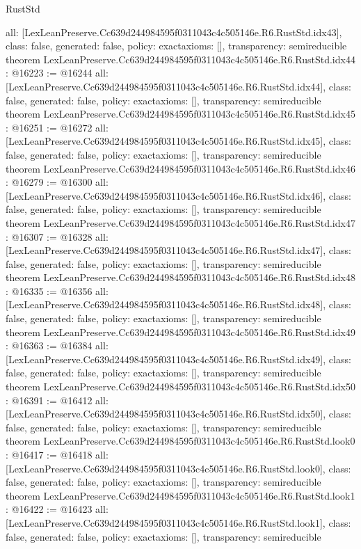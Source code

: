 \begin{lexlean}{RustStd}
\begin{coremodule}
{  all: [LexLeanPreserve.Cc639d244984595f0311043c4c505146e.R6.RustStd.idx43],
  class: false,
  generated: false,
  policy: exact{axioms: []},
  transparency: semireducible
}
theorem LexLeanPreserve.Cc639d244984595f0311043c4c505146e.R6.RustStd.idx44 : @16223 := @16244 {
  all: [LexLeanPreserve.Cc639d244984595f0311043c4c505146e.R6.RustStd.idx44],
  class: false,
  generated: false,
  policy: exact{axioms: []},
  transparency: semireducible
}
theorem LexLeanPreserve.Cc639d244984595f0311043c4c505146e.R6.RustStd.idx45 : @16251 := @16272 {
  all: [LexLeanPreserve.Cc639d244984595f0311043c4c505146e.R6.RustStd.idx45],
  class: false,
  generated: false,
  policy: exact{axioms: []},
  transparency: semireducible
}
theorem LexLeanPreserve.Cc639d244984595f0311043c4c505146e.R6.RustStd.idx46 : @16279 := @16300 {
  all: [LexLeanPreserve.Cc639d244984595f0311043c4c505146e.R6.RustStd.idx46],
  class: false,
  generated: false,
  policy: exact{axioms: []},
  transparency: semireducible
}
theorem LexLeanPreserve.Cc639d244984595f0311043c4c505146e.R6.RustStd.idx47 : @16307 := @16328 {
  all: [LexLeanPreserve.Cc639d244984595f0311043c4c505146e.R6.RustStd.idx47],
  class: false,
  generated: false,
  policy: exact{axioms: []},
  transparency: semireducible
}
theorem LexLeanPreserve.Cc639d244984595f0311043c4c505146e.R6.RustStd.idx48 : @16335 := @16356 {
  all: [LexLeanPreserve.Cc639d244984595f0311043c4c505146e.R6.RustStd.idx48],
  class: false,
  generated: false,
  policy: exact{axioms: []},
  transparency: semireducible
}
theorem LexLeanPreserve.Cc639d244984595f0311043c4c505146e.R6.RustStd.idx49 : @16363 := @16384 {
  all: [LexLeanPreserve.Cc639d244984595f0311043c4c505146e.R6.RustStd.idx49],
  class: false,
  generated: false,
  policy: exact{axioms: []},
  transparency: semireducible
}
theorem LexLeanPreserve.Cc639d244984595f0311043c4c505146e.R6.RustStd.idx50 : @16391 := @16412 {
  all: [LexLeanPreserve.Cc639d244984595f0311043c4c505146e.R6.RustStd.idx50],
  class: false,
  generated: false,
  policy: exact{axioms: []},
  transparency: semireducible
}
theorem LexLeanPreserve.Cc639d244984595f0311043c4c505146e.R6.RustStd.look0 : @16417 := @16418 {
  all: [LexLeanPreserve.Cc639d244984595f0311043c4c505146e.R6.RustStd.look0],
  class: false,
  generated: false,
  policy: exact{axioms: []},
  transparency: semireducible
}
theorem LexLeanPreserve.Cc639d244984595f0311043c4c505146e.R6.RustStd.look1 : @16422 := @16423 {
  all: [LexLeanPreserve.Cc639d244984595f0311043c4c505146e.R6.RustStd.look1],
  class: false,
  generated: false,
  policy: exact{axioms: []},
  transparency: semireducible
}
\end{coremodule}
\end{lexlean}
